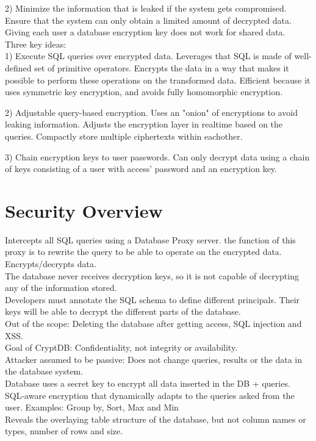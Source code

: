 \documentclass[10pt]{article}
\begin{document}
2) Minimize the information that is leaked if the system gets compromised. Ensure that the system can only obtain a limited amount of decrypted data.
Giving each user a database encryption key does not work for shared data.\\

Three key ideas:\\

1) Execute SQL queries over encrypted data. Leverages that SQL is made of well-defined set of primitive operators. Encrypts the data in a way that makes it possible to perform these operations on the transformed data. Efficient because it uses symmetric key encryption, and avoids fully homomorphic encryption.

2) Adjustable query-based encryption. Uses an "onion" of encryptions to avoid leaking information. Adjusts the encryption layer in realtime based on the queries. Compactly store multiple ciphertexts within eachother.

3) Chain encryption keys to user passwords. Can only decrypt data using a chain of keys consisting of a user with access' password and an encryption key.\\

\section{Security Overview}

Intercepts all SQL queries using a Database Proxy server. the function of this proxy is to rewrite the query to be able to operate on the encrypted data. Encrypts/decrypts data.\\

The database never receives decryption keys, so it is not capable of decrypting any of the information stored.\\

Developers must annotate the SQL schema to define different principals. Their keys will be able to decrypt the different parts of the database.\\

Out of the scope: Deleting the database after getting access, SQL injection and XSS.\\

Goal of CryptDB: Confidentiality, not integrity or availability.\\

Attacker assumed to be passive: Does not change queries, results or the data in the database system.\\

Database uses a secret key to encrypt all data inserted in the DB + queries.\\

SQL-aware encryption that dynamically adapts to the queries asked from the user. Examples: Group by, Sort, Max and Min\\

Reveals the overlaying table structure of the database, but not column names or types, number of rows and size.\\
\end{document}
